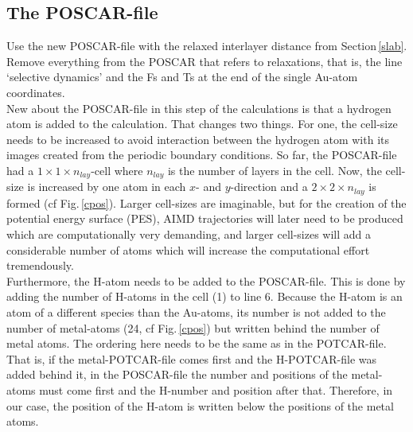 \documentclass[twoside, 11pt, titlepage, captions=nooneline, a4paper, headsepline]{scrbook}%
\begin{document}
\subsection{The POSCAR-file}
Use the new POSCAR-file with the relaxed interlayer distance from Section\,\ref{slab}. Remove everything from the POSCAR that refers to relaxations, that is, the line `selective dynamics' and the Fs and Ts at the end of the single Au-atom coordinates.\\
New about the POSCAR-file in this step of the calculations is that a hydrogen atom is added to the calculation. That changes two things. For one, the cell-size needs to be increased to avoid interaction between the hydrogen atom with its images created from the periodic boundary conditions. So far, the POSCAR-file had a $1\times1\times n_{lay}$-cell where $n_{lay}$ is the number of layers in the cell. Now, the cell-size is increased by one atom in each $x$- and $y$-direction and a $2\times2\times n_{lay}$ is formed (cf Fig.\,\ref{cpos}). Larger cell-sizes are imaginable, but for the creation of the potential energy surface (PES), AIMD trajectories will later need to be produced which are computationally very demanding, and larger cell-sizes will add a considerable number of atoms which will increase the computational effort tremendously.\\
Furthermore, the H-atom needs to be added to the POSCAR-file. This is done by adding the number of H-atoms in the cell (1) to line 6. Because the H-atom is an atom of a different species than the Au-atoms, its number is not added to the number of metal-atoms (24, cf Fig.\,\ref{cpos}) but written behind the number of metal atoms. The ordering here needs to be the same as in the POTCAR-file. That is, if the metal-POTCAR-file comes first and the H-POTCAR-file was added behind it, in the POSCAR-file the number and positions of the metal-atoms must come first and the H-number and position after that. Therefore, in our case, the position of the H-atom is written below the positions of the metal atoms.
\end{document}
